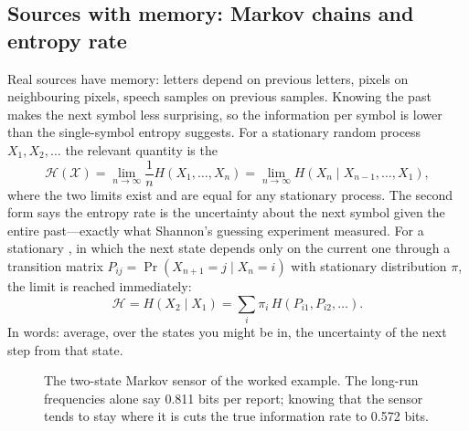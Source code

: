 \subsection{Sources with memory: Markov chains and entropy rate}

Real sources have memory: letters depend on previous letters, pixels on neighbouring pixels,
speech samples on previous samples. Knowing the past makes the next symbol less surprising, so the
information per symbol is lower than the single-symbol entropy suggests. For a stationary random
process $X_1,X_2,\ldots$ the relevant quantity is the 
\begin{equation}
\mathcal{H}(\mathcal{X})=\lim_{n\to\infty}\frac1nH(X_1,\ldots,X_n)
=\lim_{n\to\infty}H(X_n\mid X_{n-1},\ldots,X_1),
\label{eq:ch13:rate}
\end{equation}
where the two limits exist and are equal for any stationary process. The second form says the
entropy rate is the uncertainty about the next symbol given the entire past---exactly what
Shannon's guessing experiment measured. For a stationary , in which the next
state depends only on the current one through a transition matrix $P_{ij}=\Pr(X_{n+1}=j\mid
X_n=i)$ with stationary distribution $\pi$, the limit is reached immediately:
\begin{equation}
\mathcal{H}=H(X_2\mid X_1)=\sum_i\pi_i\,H(P_{i1},P_{i2},\ldots).
\label{eq:ch13:markov}
\end{equation}
In words: average, over the states you might be in, the uncertainty of the next step from that
state.

\begin{figure}[htbp]\centering
{}
\caption{The two-state Markov sensor of the worked example. The long-run frequencies alone say
0.811 bits per report; knowing that the sensor tends to stay where it is cuts the true information
rate to 0.572 bits.}
\label{fig:ch13_markov}
\end{figure}

